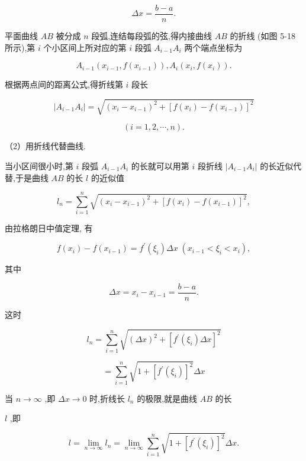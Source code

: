 \documentclass[10pt]{article}
\begin{document}
\[
{\Delta x} = \frac{b - a}{n}.
\]

平面曲线 \({AB}\) 被分成 \(n\) 段弧,连结每段弧的弦,得内接曲线 \({AB}\) 的折线 (如图 5-18 所示),第 \(i\) 个小区间上所对应的第 \(i\) 段弧 \({A}_{i - 1}{A}_{i}\) 两个端点坐标为

\[
{A}_{i - 1}\left( {{x}_{i - 1},f\left( {x}_{i - 1}\right) }\right) ,{A}_{i}\left( {{x}_{i},f\left( {x}_{i}\right) }\right) .
\]

根据两点间的距离公式,得折线第 \(i\) 段长

\[
\left| {{A}_{i - 1}{A}_{i}}\right| = \sqrt{{\left( {x}_{i} - {x}_{i - 1}\right) }^{2} + {\left\lbrack f\left( {x}_{i}\right) - f\left( {x}_{i - 1}\right) \right\rbrack }^{2}}
\]

\[
\left( {i = 1,2,\cdots ,n}\right) \text{.}
\]

（2）用折线代替曲线.

当小区间很小时,第 \(i\) 段弧 \({A}_{i - 1}{A}_{i}\) 的长就可以用第 \(i\) 段折线 \(\left| {{A}_{i - 1}{A}_{i}}\right|\) 的长近似代替,于是曲线 \({AB}\) 的长 \(l\) 的近似值

\[
{l}_{n} = \mathop{\sum }\limits_{{i = 1}}^{n}\sqrt{{\left( {x}_{i} - {x}_{i - 1}\right) }^{2} + {\left\lbrack f\left( {x}_{i}\right) - f\left( {x}_{i - 1}\right) \right\rbrack }^{2}}, \tag{1}
\]

由拉格朗日中值定理, 有

\[
f\left( {x}_{i}\right) - f\left( {x}_{i - 1}\right) = {f}^{\prime }\left( {\xi }_{i}\right) {\Delta x}\;\left( {{x}_{i - 1} < {\xi }_{i} < {x}_{i}}\right) ,
\]

其中

\[
{\Delta x} = {x}_{i} - {x}_{i - 1} = \frac{b - a}{n}.
\]

这时

\[
{l}_{n} = \mathop{\sum }\limits_{{i = 1}}^{n}\sqrt{{\left( \Delta x\right) }^{2} + {\left\lbrack {f}^{\prime }\left( {\xi }_{i}\right) \Delta x\right\rbrack }^{2}}
\]

\[
= \mathop{\sum }\limits_{{i = 1}}^{n}\sqrt{1 + {\left\lbrack {f}^{\prime }\left( {\xi }_{i}\right) \right\rbrack }^{2}}{\Delta x}
\]

当 \(n \rightarrow \infty\) ,即 \({\Delta x} \rightarrow 0\) 时,折线长 \({l}_{n}\) 的极限,就是曲线 \({AB}\) 的长

\(l\) ,即

\[
l = \mathop{\lim }\limits_{{n \rightarrow \infty }}{l}_{n} = \mathop{\lim }\limits_{{n \rightarrow \infty }}\mathop{\sum }\limits_{{i = 1}}^{n}\sqrt{1 + {\left\lbrack {f}^{\prime }\left( {\xi }_{i}\right) \right\rbrack }^{2}}{\Delta x}.
\]
\end{document}
